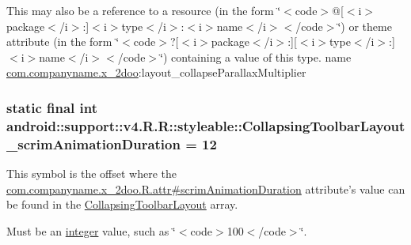This may also be a reference to a resource (in the form \char`\"{}$<$code$>$@\mbox{[}$<$i$>$package$<$/i$>$:\mbox{]}$<$i$>$type$<$/i$>$:$<$i$>$name$<$/i$>$$<$/code$>$\char`\"{}) or theme attribute (in the form \char`\"{}$<$code$>$?\mbox{[}$<$i$>$package$<$/i$>$:\mbox{]}\mbox{[}$<$i$>$type$<$/i$>$:\mbox{]}$<$i$>$name$<$/i$>$$<$/code$>$\char`\"{}) containing a value of this type.  name \hyperlink{namespacecom_1_1companyname_1_1x__2doo}{com.companyname.x\_\-2doo}:layout\_\-collapseParallaxMultiplier \hypertarget{classandroid_1_1support_1_1v4_1_1_r_1_1styleable_86f1d13a3a764019f8ea6f2166dabaac}{
\subsubsection[{CollapsingToolbarLayout\_\-scrimAnimationDuration}]{\setlength{\rightskip}{0pt plus 5cm}static final int android::support::v4.R.R::styleable::CollapsingToolbarLayout\_\-scrimAnimationDuration = 12}}
\label{classandroid_1_1support_1_1v4_1_1_r_1_1styleable_86f1d13a3a764019f8ea6f2166dabaac}


This symbol is the offset where the \hyperlink{classcom_1_1companyname_1_1x__2doo_1_1_r_1_1attr_7151504f26bbcbbe9139f585e5da23c4}{com.companyname.x\_\-2doo.R.attr\#scrimAnimationDuration} attribute's value can be found in the \hyperlink{classandroid_1_1support_1_1v4_1_1_r_1_1styleable_aa101903fcf4b45a3b7fee0a0abc5ea8}{CollapsingToolbarLayout} array.

Must be an \hyperlink{classandroid_1_1support_1_1v4_1_1_r_1_1integer}{integer} value, such as \char`\"{}$<$code$>$100$<$/code$>$\char`\"{}. 

